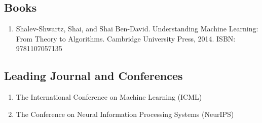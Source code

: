 \subsection{Books}
\begin{enumerate}[1] 
    \item Shalev-Shwartz, Shai, and Shai Ben-David. Understanding Machine Learning: From Theory to Algorithms. Cambridge University Press, 2014. ISBN: 9781107057135
\end{enumerate}

\subsection{Leading Journal and Conferences}

\begin{enumerate}[1] 
    \item The International Conference on Machine Learning (ICML)
    \item The Conference on Neural Information Processing Systems (NeurIPS)     
\end{enumerate}

